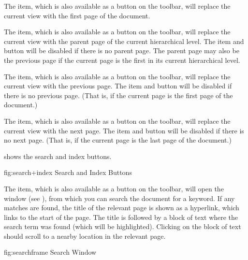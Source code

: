 The  item, which is also available
as a button on the toolbar, will replace the current view with the
first page of the document.


The  item, which is also available
as a button on the toolbar, will replace the current view with the
parent page of the current hierarchical level. The item and button
will be disabled if there is no parent page. The parent page may
also be the previous page if the current page is the first in its
current hierarchical level.


The  item, which is also available as
a button on the toolbar, will replace the current view with the
previous page. The item and button will be disabled if there is no
previous page. (That is, if the current page is the first
page of the document.)


The  item, which is also available as
a button on the toolbar, will replace the current view with the
next page. The item and button will be disabled if there is no
next page. (That is, if the current page is the last
page of the document.)

 shows the search and index buttons.

\FloatFig
{fig:search+index}
{%
}
{Search and Index Buttons}


The  item, which is also available
as a button on the toolbar, will open the
 window (see
), from which you can search the document
for a keyword. If any matches are found, the title of the relevant
page is shown as a hyperlink, which links to the start of the page.
The title is followed by a block of text where the search term was
found (which will be highlighted). Clicking on the block of text
should scroll to a nearby location in the relevant page.

\FloatFig
{fig:searchframe}
{%
}
{Search Window}

